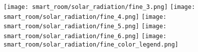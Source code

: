 \begin{figure}[H]
\texttt{[image: smart\_room/solar\_radiation/fine\_3.png]}\hfill
\texttt{[image: smart\_room/solar\_radiation/fine\_4.png]}\hfill
\texttt{[image: smart\_room/solar\_radiation/fine\_5.png]}\hfill
\texttt{[image: smart\_room/solar\_radiation/fine\_6.png]}\hfill
\texttt{[image: smart\_room/solar\_radiation/fine\_color\_legend.png]}\hfill
\caption{}
\label{fine-radiation}
\end{figure}











































